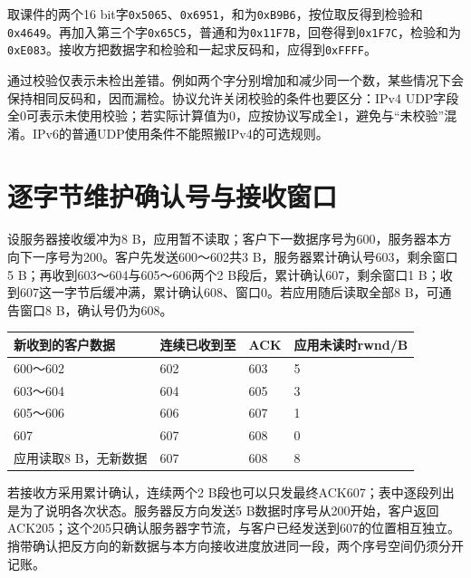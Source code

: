 取课件的两个16 bit字\texttt{0x5065}、\texttt{0x6951}，和为\texttt{0xB9B6}，按位取反得到检验和\texttt{0x4649}。再加入第三个字\texttt{0x65C5}，普通和为\texttt{0x11F7B}，回卷得到\texttt{0x1F7C}，检验和为\texttt{0xE083}。接收方把数据字和检验和一起求反码和，应得到\texttt{0xFFFF}。

通过校验仅表示未检出差错。例如两个字分别增加和减少同一个数，某些情况下会保持相同反码和，因而漏检。协议允许关闭校验的条件也要区分：IPv4 UDP字段全0可表示未使用校验；若实际计算值为0，应按协议写成全1，避免与``未校验''混淆。IPv6的普通UDP使用条件不能照搬IPv4的可选规则。

\section{逐字节维护确认号与接收窗口}\label{CN05-course-byte-trace}

设服务器接收缓冲为8 B，应用暂不读取；客户下一数据序号为600，服务器本方向下一序号为200。客户先发送600～602共3 B，服务器累计确认号603，剩余窗口5 B；再收到603～604与605～606两个2 B段后，累计确认607，剩余窗口1 B；收到607这一字节后缓冲满，累计确认608、窗口0。若应用随后读取全部8 B，可通告窗口8 B，确认号仍为608。

\begin{wideblock}

\par\medskip\noindent\begin{minipage}{\linewidth}\fontsize{9.3}{12}\selectfont\begin{tabularx}{\linewidth}{@{}YYYY@{}}
\toprule\noalign{}
新收到的客户数据 & 连续已收到至 & ACK & 应用未读时rwnd/B \\
\midrule\noalign{}


600～602 & 602 & 603 & 5 \\
603～604 & 604 & 605 & 3 \\
605～606 & 606 & 607 & 1 \\
607 & 607 & 608 & 0 \\
应用读取8 B，无新数据 & 607 & 608 & 8 \\
\bottomrule\end{tabularx}
\end{minipage}\par\medskip

\end{wideblock}

若接收方采用累计确认，连续两个2 B段也可以只发最终ACK607；表中逐段列出是为了说明各次状态。服务器反方向发送5 B数据时序号从200开始，客户返回ACK205；这个205只确认服务器字节流，与客户已经发送到607的位置相互独立。捎带确认把反方向的新数据与本方向接收进度放进同一段，两个序号空间仍须分开记账。


